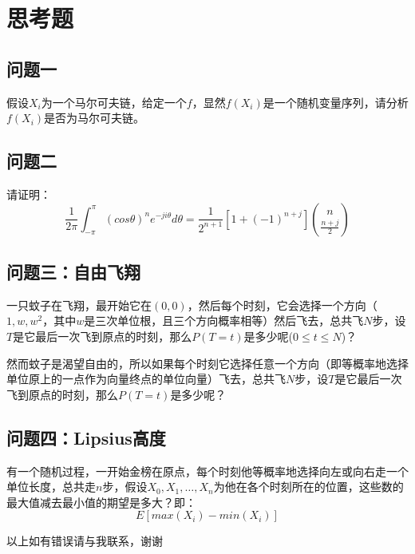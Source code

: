 \section{思考题}
	\subsection{问题一}
		假设$X_i$为一个马尔可夫链，给定一个$f$，显然$f(X_i)$是一个随机变量序列，请分析$f(X_i)$是否为马尔可夫链。

	\subsection{问题二}
		请证明：
		$$
		\frac{1}{2\pi}\int_{-\pi}^{\pi}(cos\theta)^ne^{-ji\theta}d\theta = \frac{1}{2^{n+1}}[1+(-1)^{n+j}]\binom{n}{\frac{n+j}{2}}
		$$
	\subsection{问题三：自由飞翔}
		一只蚊子在飞翔，最开始它在$(0,0)$，然后每个时刻，它会选择一个方向（$1,w,w^2$，其中$w$是三次单位根，且三个方向概率相等）然后飞去，总共飞$N$步，设$T$是它最后一次飞到原点的时刻，那么$P(T=t)$是多少呢($0\leq t \leq N$)？
		
		然而蚊子是渴望自由的，所以如果每个时刻它选择任意一个方向（即等概率地选择单位原上的一点作为向量终点的单位向量）飞去，总共飞$N$步，设$T$是它最后一次飞到原点的时刻，那么$P(T=t)$是多少呢？
		
	\subsection{问题四：Lipsius高度}
		有一个随机过程，一开始金榜在原点，每个时刻他等概率地选择向左或向右走一个单位长度，总共走$n$步，假设$X_0, X_1, \dots, X_n$为他在各个时刻所在的位置，这些数的最大值减去最小值的期望是多大？即：
		$$
			E[max(X_i) - min(X_i)]
		$$
	
	\vspace{2cm}
	以上如有错误请与我联系，谢谢
　
